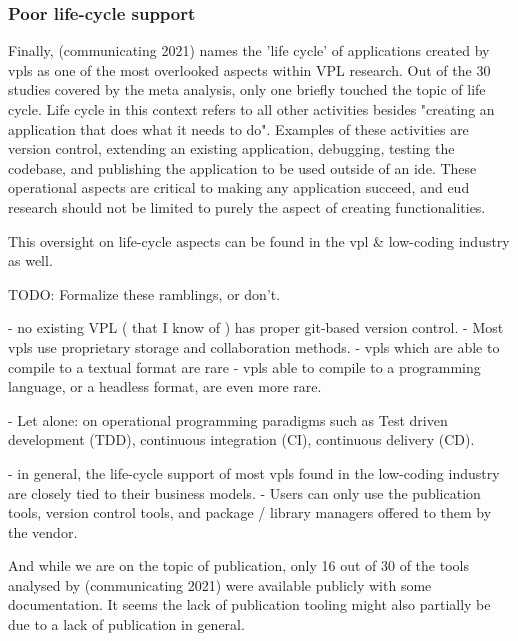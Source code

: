 
\subsubsection*{Poor life-cycle support}
Finally, (communicating 2021) names the 'life cycle' of applications created by \ac{vpl}s as one of the most overlooked aspects within VPL research.
Out of the 30 studies covered by the meta analysis, only one briefly touched the topic of life cycle. 
Life cycle in this context refers to all other activities besides "creating an application that does what it needs to do".
Examples of these activities are version control, extending an existing application, debugging, testing the codebase, and publishing the application to be used outside of an \ac{ide}. 
These operational aspects are critical to making any application succeed, and \ac{eud} research should not be limited to purely the aspect of creating functionalities.

This oversight on life-cycle aspects can be found in the \ac{vpl} \& low-coding industry as well. 
\begin{note}
TODO: Formalize these ramblings, or don't. 

- no existing VPL ( that I know of ) has proper git-based version control. 
  - Most vpls use proprietary storage and collaboration methods. 
- vpls which are able to compile to a textual format are rare
  - vpls able to compile to a programming language, or a headless format, are even more rare. 

- Let alone: on operational programming paradigms such as Test driven development (TDD), continuous integration (CI), continuous delivery (CD).  

- in general, the life-cycle support of most vpls found in the low-coding industry are closely tied to their business models. 
  - Users can only use the publication tools, version control tools, and package / library managers offered to them by the vendor.

\end{note}

And while we are on the topic of publication, only 16 out of 30 of the tools analysed by (communicating 2021) were available publicly with some documentation.
It seems the lack of publication tooling might also partially be due to a lack of publication in general. 

